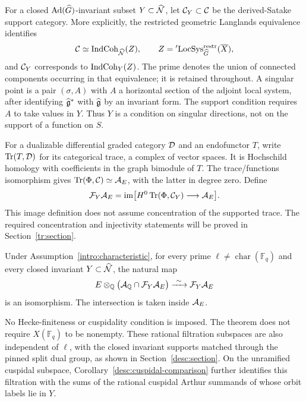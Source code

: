 For a closed $\operatorname{Ad}(\widehat G)$-invariant subset $Y\subset\widehat{\mathcal N}$, let
$\mathcal C_Y\subset\mathcal C$ be the derived-Satake support category. More explicitly,
the restricted geometric Langlands equivalence identifies
\begin{equation}\label{intro:restricted-equivalence}
\mathcal C\simeq\operatorname{IndCoh}_{\widehat{\mathcal N}}(Z),\qquad
Z={}^{\prime}\!\operatorname{LocSys}_{\widehat G}^{\mathrm{restr}}(\overline X),
\end{equation}
and $\mathcal C_Y$ corresponds to $\operatorname{IndCoh}_Y(Z)$. The prime denotes the union of
connected components occurring in that equivalence; it is retained
throughout. A singular point is a pair $(\sigma,A)$ with $A$ a horizontal
section of the adjoint local system, after identifying $\widehat{\mathfrak g}^*$ with
$\widehat{\mathfrak g}$ by an invariant form. The support condition requires $A$ to take
values in $Y$. Thus $Y$ is a condition on singular directions, not on the
support of a function on $S$.

For a dualizable differential graded category $\mathcal D$ and an endofunctor
$T$, write $\operatorname{Tr}(T,\mathcal D)$ for its categorical trace, a complex of vector
spaces. It is Hochschild homology with coefficients in the graph bimodule
of $T$. The trace/functions isomorphism gives
$\operatorname{Tr}(\Phi,\mathcal C)\simeq\mathcal A_E$, with the latter in degree zero. Define
\begin{equation}\label{intro:filtration}
\mathcal F_Y\mathcal A_E=
\operatorname{im}\bigl[H^0\operatorname{Tr}(\Phi,\mathcal C_Y)\longrightarrow\mathcal A_E\bigr].
\end{equation}
This image definition does not assume concentration of the supported
trace. The required concentration and injectivity statements will be
proved in Section~\ref{tr:section}.

\begin{theorem}\label{intro:main}
Under Assumption~\ref{intro:characteristic}, for every prime
$\ell\ne\operatorname{char}(\mathbb F_q)$ and every closed invariant
$Y\subset\widehat{\mathcal N}$, the natural map
\begin{equation}\label{intro:main-map}
E\otimes_\mathbb Q\bigl(\mathcal A_\mathbb Q\cap\mathcal F_Y\mathcal A_E\bigr)
\xrightarrow{\ \sim\ }\mathcal F_Y\mathcal A_E
\end{equation}
is an isomorphism. The intersection is taken inside $\mathcal A_E$.
\end{theorem}

No Hecke-finiteness or cuspidality condition is imposed. The theorem does
not require $X(\mathbb F_q)$ to be nonempty. These rational filtration
subspaces are also independent of $\ell$, with the closed invariant
supports matched through the pinned split dual group, as shown in
Section~\ref{desc:section}. On the unramified cuspidal subspace,
Corollary~\ref{desc:cuspidal-comparison} further identifies this filtration
with the sums of the rational cuspidal Arthur summands of
\cite[Theorem~1.1]{CuspidalArthur} whose orbit labels lie in $Y$.

